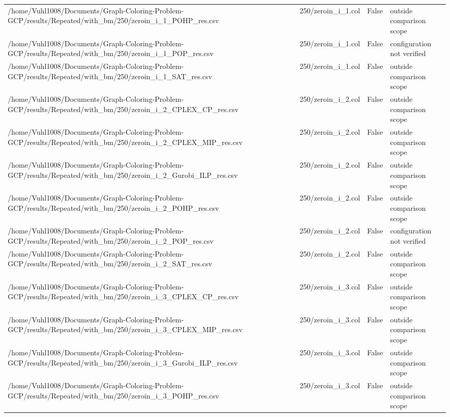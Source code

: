 \begin{table}[htbp]
\begin{tabular}{llll}
/home/Vuhl1008/Documents/Graph-Coloring-Problem-GCP/results/Repeated/with\_bm/250/zeroin\_i\_1\_POHP\_res.csv & 250/zeroin\_i\_1.col & False & outside comparison scope \\
/home/Vuhl1008/Documents/Graph-Coloring-Problem-GCP/results/Repeated/with\_bm/250/zeroin\_i\_1\_POP\_res.csv & 250/zeroin\_i\_1.col & False & configuration not verified \\
/home/Vuhl1008/Documents/Graph-Coloring-Problem-GCP/results/Repeated/with\_bm/250/zeroin\_i\_1\_SAT\_res.csv & 250/zeroin\_i\_1.col & False & outside comparison scope \\
/home/Vuhl1008/Documents/Graph-Coloring-Problem-GCP/results/Repeated/with\_bm/250/zeroin\_i\_2\_CPLEX\_CP\_res.csv & 250/zeroin\_i\_2.col & False & outside comparison scope \\
/home/Vuhl1008/Documents/Graph-Coloring-Problem-GCP/results/Repeated/with\_bm/250/zeroin\_i\_2\_CPLEX\_MIP\_res.csv & 250/zeroin\_i\_2.col & False & outside comparison scope \\
/home/Vuhl1008/Documents/Graph-Coloring-Problem-GCP/results/Repeated/with\_bm/250/zeroin\_i\_2\_Gurobi\_ILP\_res.csv & 250/zeroin\_i\_2.col & False & outside comparison scope \\
/home/Vuhl1008/Documents/Graph-Coloring-Problem-GCP/results/Repeated/with\_bm/250/zeroin\_i\_2\_POHP\_res.csv & 250/zeroin\_i\_2.col & False & outside comparison scope \\
/home/Vuhl1008/Documents/Graph-Coloring-Problem-GCP/results/Repeated/with\_bm/250/zeroin\_i\_2\_POP\_res.csv & 250/zeroin\_i\_2.col & False & configuration not verified \\
/home/Vuhl1008/Documents/Graph-Coloring-Problem-GCP/results/Repeated/with\_bm/250/zeroin\_i\_2\_SAT\_res.csv & 250/zeroin\_i\_2.col & False & outside comparison scope \\
/home/Vuhl1008/Documents/Graph-Coloring-Problem-GCP/results/Repeated/with\_bm/250/zeroin\_i\_3\_CPLEX\_CP\_res.csv & 250/zeroin\_i\_3.col & False & outside comparison scope \\
/home/Vuhl1008/Documents/Graph-Coloring-Problem-GCP/results/Repeated/with\_bm/250/zeroin\_i\_3\_CPLEX\_MIP\_res.csv & 250/zeroin\_i\_3.col & False & outside comparison scope \\
/home/Vuhl1008/Documents/Graph-Coloring-Problem-GCP/results/Repeated/with\_bm/250/zeroin\_i\_3\_Gurobi\_ILP\_res.csv & 250/zeroin\_i\_3.col & False & outside comparison scope \\
/home/Vuhl1008/Documents/Graph-Coloring-Problem-GCP/results/Repeated/with\_bm/250/zeroin\_i\_3\_POHP\_res.csv & 250/zeroin\_i\_3.col & False & outside comparison scope \\

\end{tabular}
\end{table}
